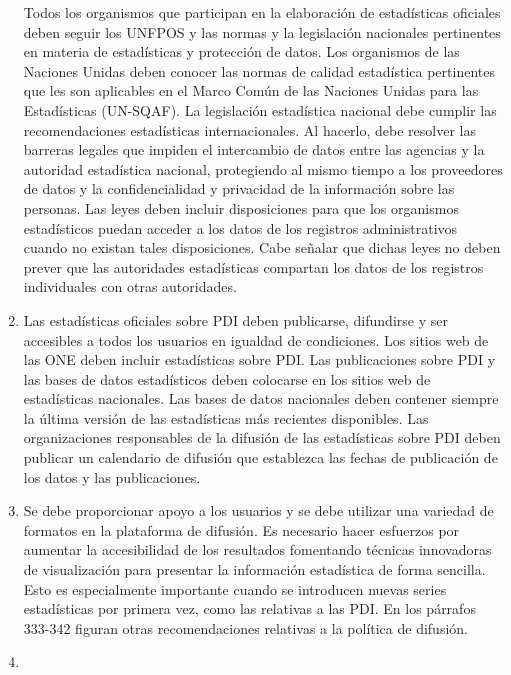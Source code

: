 \documentclass[
]{book}
\begin{document}
\begin{enumerate}
  Todos los organismos que participan en la elaboración de estadísticas oficiales deben seguir los UNFPOS y las normas y la legislación nacionales pertinentes en materia de estadísticas y protección de datos. Los organismos de las Naciones Unidas deben conocer las normas de calidad estadística pertinentes que les son aplicables en el Marco Común de las Naciones Unidas para las Estadísticas (UN-SQAF). La legislación estadística nacional debe cumplir las recomendaciones estadísticas internacionales. Al hacerlo, debe resolver las barreras legales que impiden el intercambio de datos entre las agencias y la autoridad estadística nacional, protegiendo al mismo tiempo a los proveedores de datos y la confidencialidad y privacidad de la información sobre las personas. Las leyes deben incluir disposiciones para que los organismos estadísticos puedan acceder a los datos de los registros administrativos cuando no existan tales disposiciones. Cabe señalar que dichas leyes no deben prever que las autoridades estadísticas compartan los datos de los registros individuales con otras autoridades.
\item
  Las estadísticas oficiales sobre PDI deben publicarse, difundirse y ser accesibles a todos los usuarios en igualdad de condiciones. Los sitios web de las ONE deben incluir estadísticas sobre PDI. Las publicaciones sobre PDI y las bases de datos estadísticos deben colocarse en los sitios web de estadísticas nacionales. Las bases de datos nacionales deben contener siempre la última versión de las estadísticas más recientes disponibles. Las organizaciones responsables de la difusión de las estadísticas sobre PDI deben publicar un calendario de difusión que establezca las fechas de publicación de los datos y las publicaciones.
\item
  Se debe proporcionar apoyo a los usuarios y se debe utilizar una variedad de formatos en la plataforma de difusión. Es necesario hacer esfuerzos por aumentar la accesibilidad de los resultados fomentando técnicas innovadoras de visualización para presentar la información estadística de forma sencilla. Esto es especialmente importante cuando se introducen nuevas series estadísticas por primera vez, como las relativas a las PDI. En los párrafos 333-342 figuran otras recomendaciones relativas a la política de difusión.
\item

\end{enumerate}
\end{document}
